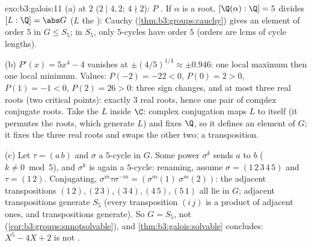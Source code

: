 \begin{solution}{exo:b3:galois:11}
(a)  at $2$ ($2 \mid 4, 2$; $4 \nmid 2$): $P$
. If $\alpha$ is a root, $[\Q(\alpha):\Q] = 5$
divides $[L:\Q] = \abs G$ ($L$ the ): Cauchy
(\cref{thm:b3:groups:cauchy}) gives an element of order $5$ in
$G \leq S_5$; in $S_5$, only $5$-cycles have order $5$ (orders
are lcms of cycle lengths).

(b) $P'(x) = 5x^4 - 4$ vanishes at $\pm(4/5)^{1/4} \approx \pm
0.946$: one local maximum then one local minimum. Values: $P(-2)
= -22 < 0$, $P(0) = 2 > 0$, $P(1) = -1 < 0$, $P(2) = 26 > 0$:
three sign changes, and at most three real roots (two critical
points): exactly $3$ real roots, hence one pair of complex
conjugate roots. Take the  $L$ inside $\C$:
complex conjugation maps $L$ to itself (it permutes the roots,
which generate $L$) and fixes $\Q$, so it defines an element of
$G$; it fixes the three real roots and swaps the other two: a
transposition.

(c) Let $\tau = (a\,b)$ and $\sigma$ a $5$-cycle in $G$. Some
power $\sigma^k$ sends $a$ to $b$ ($k \ne 0 \bmod 5$), and
$\sigma^k$ is again a $5$-cycle: renaming, assume $\sigma =
(1\,2\,3\,4\,5)$ and $\tau = (1\,2)$. Conjugating,
$\sigma^m\tau\sigma^{-m} = (\sigma^m(1)\ \sigma^m(2))$: the
adjacent transpositions $(1\,2), (2\,3), (3\,4), (4\,5),
(5\,1)$ all lie in $G$; adjacent transpositions generate $S_5$
(every transposition $(i\,j)$ is a product of adjacent ones,
and transpositions generate). So $G = S_5$, not 
(\cref{cor:b3:groups:snnotsolvable}), and
\cref{thm:b3:galois:solvable} concludes: $X^5 - 4X + 2$ is not
.
\end{solution}

